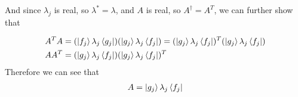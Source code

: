 \documentclass{article}
\begin{document}
And since $\lambda_j$ is real, so $\lambda^* = \lambda$, and $A$ is real, so $A^\dagger = A^T$, we can further show that 

\begin{align}
    A^T A &= (\ket{f_j} \lambda_j \bra{g_j})(\ket{g_j} \lambda_j \bra{f_j}) = (\ket{g_j} \lambda_j \bra{f_j})^T (\ket{g_j} \lambda_j \bra{f_j}) \\
    AA^T &= (\ket{g_j} \lambda_j \bra{f_j})(\ket{g_j} \lambda_j \bra{f_j})^T
\end{align}
Therefore we can see that 
\begin{align}
    A = \ket{g_j} \lambda_j \bra{f_j}
\end{align}
\end{document}
